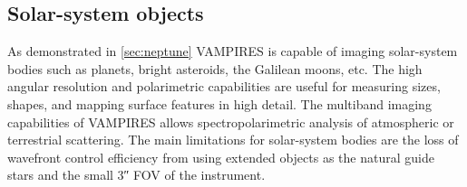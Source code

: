 \subsection{Solar-system objects}

As demonstrated in \autoref{sec:neptune} VAMPIRES is capable of imaging solar-system bodies such as planets, bright asteroids, the Galilean moons, etc. The high angular resolution and polarimetric capabilities are useful for measuring sizes, shapes, and mapping surface features in high detail. The multiband imaging capabilities of VAMPIRES allows spectropolarimetric analysis of atmospheric or terrestrial scattering. The main limitations for solar-system bodies are the loss of wavefront control efficiency from using extended objects as the natural guide stars and the small \ang{;;3} FOV of the instrument.

